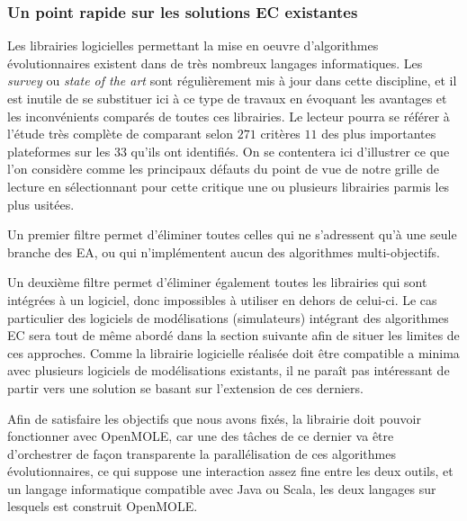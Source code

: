 



\subsubsection{Un point rapide sur les solutions EC existantes}
\label{sssec:EC_existantes}

Les librairies logicielles permettant la mise en oeuvre d'algorithmes évolutionnaires existent dans de très nombreux langages informatiques. Les \textit{survey} ou \textit{state of the art} sont régulièrement mis à jour dans cette discipline, et il est inutile de se substituer ici à ce type de travaux en évoquant les avantages et les inconvénients comparés de toutes ces librairies. Le lecteur pourra se référer à l'étude très complète de \textcite{Parejo2012} comparant selon $271$ critères $11$ des plus importantes plateformes sur les $33$ qu'ils ont identifiés. On se contentera ici d'illustrer ce que l'on considère comme les principaux défauts du point de vue de notre grille de lecture en sélectionnant pour cette critique une ou plusieurs librairies parmis les plus usitées.

Un premier filtre permet d'éliminer toutes celles qui ne s'adressent qu'à une seule branche des EA, ou qui n'implémentent aucun des algorithmes multi-objectifs.

\medskip
Un deuxième filtre permet d'éliminer également toutes les librairies qui sont intégrées à un logiciel, donc impossibles à utiliser en dehors de celui-ci. Le cas particulier des logiciels de modélisations (simulateurs) intégrant des algorithmes EC sera tout de même abordé dans la section suivante afin de situer les limites de ces approches. Comme la librairie logicielle réalisée doit être compatible a minima avec plusieurs logiciels de modélisations existants, il ne paraît pas intéressant de partir vers une solution se basant sur l'extension de ces derniers.

Afin de satisfaire les objectifs que nous avons fixés, la librairie doit pouvoir fonctionner avec OpenMOLE, car une des tâches de ce dernier va être d'orchestrer de façon transparente la parallélisation de ces algorithmes évolutionnaires, ce qui suppose une interaction assez fine entre les deux outils, et un langage informatique compatible avec Java ou Scala, les deux langages sur lesquels est construit OpenMOLE.

